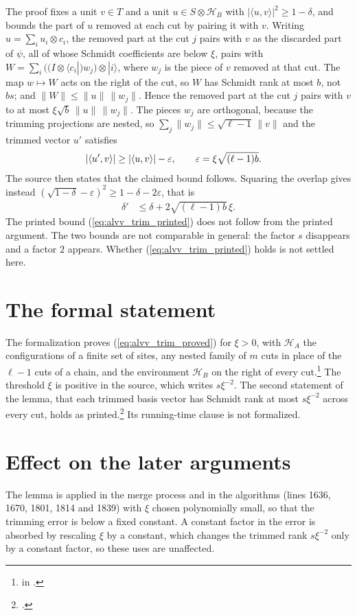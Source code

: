 \documentclass{article}
\begin{document}
The proof fixes a unit $v\in T$ and a unit $u\in S\otimes\mathcal H_B$ with
$|\langle u,v\rangle|^2\ge1-\delta$, and bounds the part of $u$ removed at
each cut by pairing it with $v$. Writing $u=\sum_iu_i\otimes c_i$, the
removed part at the cut $j$ pairs with $v$ as the discarded part of
$\psi$, all of whose Schmidt coefficients are below $\xi$, pairs with
$W=\sum_i\big((I\otimes\langle c_i|)w_j\big)\otimes|i\rangle$, where $w_j$
is the piece of $v$ removed at that cut. The map $w\mapsto W$ acts on the
right of the cut, so $W$ has Schmidt rank at most $b$, not $bs$; and
$\|W\|\le\|u\|\,\|w_j\|$. Hence the removed part at the cut $j$ pairs with
$v$ to at most $\xi\sqrt b\,\|u\|\,\|w_j\|$. The pieces $w_j$ are orthogonal,
because the trimming projections are nested, so
$\sum_j\|w_j\|\le\sqrt{\ell-1}\,\|v\|$ and the trimmed vector $u'$ satisfies
\begin{align}
    |\langle u',v\rangle|&\ge|\langle u,v\rangle|-\varepsilon,
    \qquad\varepsilon=\xi\sqrt{(\ell-1)b}.
    \notag
\end{align}
The source then states that the claimed bound follows. Squaring the
overlap gives instead $(\sqrt{1-\delta}-\varepsilon)^2\ge1-\delta-2\varepsilon$,
that is
\begin{align}
    \delta'&\le\delta+2\sqrt{(\ell-1)b}\,\xi .
    \label{eq:alvv_trim_proved}
\end{align}
The printed bound (\ref{eq:alvv_trim_printed}) does not follow from the
printed argument. The two bounds are not comparable in general: the factor
$s$ disappears and a factor $2$ appears. Whether
(\ref{eq:alvv_trim_printed}) holds is not settled here.

\section{The formal statement}

The formalization proves (\ref{eq:alvv_trim_proved}) for $\xi>0$, with
$\mathcal H_A$ the configurations of a finite set of sites, any nested
family of $m$ cuts in place of the $\ell-1$ cuts of a chain, and the
environment $\mathcal H_B$ on the right of every
cut.\footnote{ in
    .} The threshold
$\xi$ is positive in the source, which writes $s\xi^{-2}$. The second
statement of the lemma, that each trimmed basis vector has Schmidt rank at
most $s\xi^{-2}$ across every cut, holds as
printed.\footnote{.} Its
running-time clause is not formalized.

\section{Effect on the later arguments}

The lemma is applied in the merge process and in the algorithms (lines 1636,
1670, 1801, 1814 and 1839) with $\xi$ chosen polynomially small, so that the
trimming error is below a fixed constant. A constant factor in the error is
absorbed by rescaling $\xi$ by a constant, which changes the trimmed rank
$s\xi^{-2}$ only by a constant factor, so these uses are unaffected.
\end{document}
